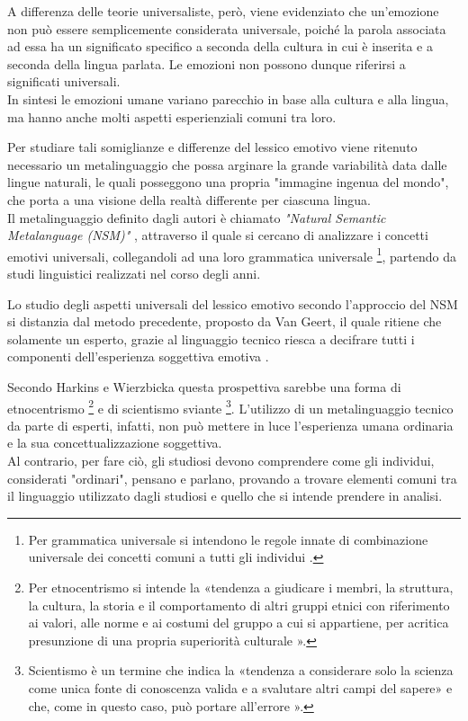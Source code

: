 A differenza delle teorie universaliste, però, viene evidenziato che un'emozione non può essere semplicemente considerata universale, poiché la parola associata ad essa ha un significato specifico a seconda della cultura in cui è inserita e a seconda della lingua parlata. Le emozioni non possono dunque riferirsi a significati universali.\\
In sintesi le emozioni umane variano parecchio in base alla cultura e alla lingua, ma hanno anche molti aspetti esperienziali comuni tra loro. 

Per studiare tali somiglianze e differenze del lessico emotivo viene ritenuto necessario un metalinguaggio che possa arginare la grande variabilità data dalle lingue naturali, le quali posseggono una propria "immagine ingenua del mondo", che porta a una visione della realtà differente per ciascuna lingua.\\
Il metalinguaggio definito dagli autori è chiamato \textit{"Natural Semantic Metalanguage (NSM)"} \parencite{Wierzbicka}, attraverso il quale si cercano di analizzare i concetti emotivi universali, collegandoli ad una loro grammatica universale \footnote{Per grammatica universale si intendono le regole innate di combinazione universale dei concetti comuni a tutti gli individui \parencite{Chomsky}.}, partendo da studi linguistici realizzati nel corso degli anni. 

Lo studio degli aspetti universali del lessico emotivo secondo l'approccio del NSM si distanzia dal metodo precedente, proposto da Van Geert, il quale ritiene che solamente un esperto, grazie al linguaggio tecnico riesca a decifrare tutti i componenti dell'esperienza soggettiva emotiva \parencite{Van_Geertz}.

Secondo Harkins e Wierzbicka questa prospettiva sarebbe una forma di etnocentrismo \footnote{Per etnocentrismo si intende la «tendenza a giudicare i membri, la struttura, la cultura, la storia e il comportamento di altri gruppi etnici con riferimento ai valori, alle norme e ai costumi del gruppo a cui si appartiene, per acritica presunzione di una propria superiorità culturale \parencite{etnocentrismo}».} e di scientismo sviante \footnote{Scientismo è un termine che indica la «tendenza a considerare solo la scienza come unica fonte di conoscenza valida e a svalutare altri campi del sapere» e che, come in questo caso, può portare all'errore \parencite{scientismo}».}.
L'utilizzo di un metalinguaggio tecnico da parte di esperti, infatti, non può mettere in luce l'esperienza umana ordinaria e la sua concettualizzazione soggettiva.\\
Al contrario, per fare ciò, gli studiosi devono comprendere come gli individui, considerati "ordinari", pensano e parlano, provando a trovare elementi comuni tra il linguaggio utilizzato dagli studiosi e quello che si intende prendere in analisi. 

